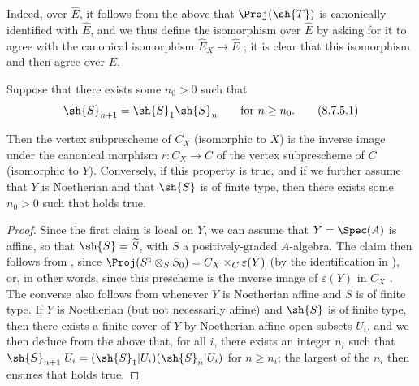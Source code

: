 \begin{remark}[8.7.4]
\begin{enumerate}
    Indeed, over $\widehat{E}$, it follows from the above that $\Proj(\sh{T})$ is canonically identified with $\widehat{E}$, and we thus define the isomorphism  over $\widehat{E}$ by asking for it to agree with the canonical isomorphism $\widehat{E}_X\to\widehat{E}$ ;
    it is clear that this isomorphism and  then agree over $E$.
\end{enumerate}
\end{remark}

\begin{corollary}[8.7.5]
\label{II.8.7.5}
Suppose that there exists some $n_0>0$ such that
\[
\label{II.8.7.5.1}
  \sh{S}_{n+1} = \sh{S}_1\sh{S}_n
  \qquad
  \text{for }n\geq n_0.
\tag{8.7.5.1}
\]

Then the vertex subprescheme of $C_X$ (isomorphic to $X$) is the inverse image under the canonical morphism $r:C_X\to C$ of the vertex subprescheme of $C$ (isomorphic to $Y$).
Conversely, if this property is true, and if we further assume that $Y$ is Noetherian and that $\sh{S}$ is of finite type, then there exists some $n_0>0$ such that  holds true.
\end{corollary}

\begin{proof}
Since the first claim is local on $Y$, we can assume that $Y=\Spec(A)$ is affine, so that $\sh{S}=\widetilde{S}$, with $S$ a positively-graded $A$-algebra.
The claim then follows from , since $\Proj(S^\natural\otimes_S S_0) = C_X\times_C\varepsilon(Y)$ (by the identification in ), or, in other words, since this prescheme is the inverse image of $\varepsilon(Y)$ in $C_X$ .
The converse also follows from  whenever $Y$ is Noetherian affine and $S$ is of finite type.
If $Y$ is Noetherian (but not necessarily affine) and $\sh{S}$ is of finite type, then there exists a finite cover of $Y$ by Noetherian affine open subsets $U_i$, and we then deduce from the above that, for all $i$, there exists an integer $n_i$ such that $\sh{S}_{n+1}|U_i = (\sh{S}_1|U_i)(\sh{S}_n|U_i)$ for $n\geq n_i$;
the largest of the $n_i$ then ensures that  holds true.
\end{proof}

